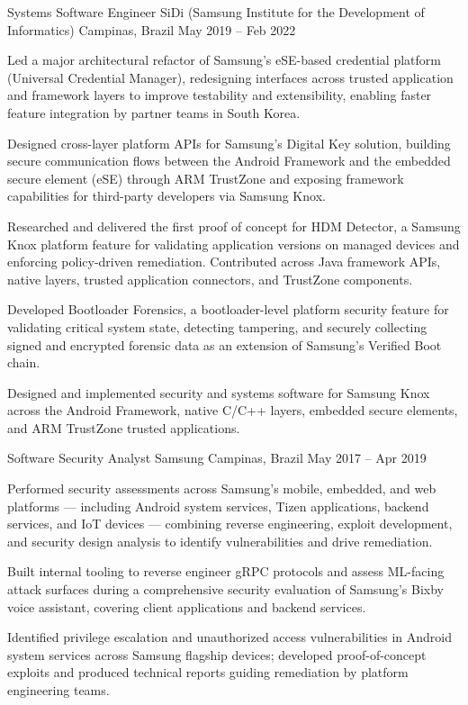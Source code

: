 \begin{cventries}
  \cventry
    {Systems Software Engineer}
    {SiDi (Samsung Institute for the Development of Informatics)}
    {Campinas, Brazil}
    {May 2019 -- Feb 2022}
    {
      \begin{cvitems}
        \item {Led a major architectural refactor of Samsung's eSE-based credential platform (Universal Credential Manager), redesigning interfaces across trusted application and framework layers to improve testability and extensibility, enabling faster feature integration by partner teams in South Korea.}
        \item {Designed cross-layer platform APIs for Samsung's Digital Key solution, building secure communication flows between the Android Framework and the embedded secure element (eSE) through ARM TrustZone and exposing framework capabilities for third-party developers via Samsung Knox.}
        \item {Researched and delivered the first proof of concept for HDM Detector, a Samsung Knox platform feature for validating application versions on managed devices and enforcing policy-driven remediation. Contributed across Java framework APIs, native layers, trusted application connectors, and TrustZone components.}
        \item {Developed Bootloader Forensics, a bootloader-level platform security feature for validating critical system state, detecting tampering, and securely collecting signed and encrypted forensic data as an extension of Samsung's Verified Boot chain.}
        \item {Designed and implemented security and systems software for Samsung Knox across the Android Framework, native C/C++ layers, embedded secure elements, and ARM TrustZone trusted applications.}
      \end{cvitems}
    }
 
 
  \cventry
    {Software Security Analyst}
    {Samsung}
    {Campinas, Brazil}
    {May 2017 -- Apr 2019}
    {
      \begin{cvitems}
        \item {Performed security assessments across Samsung's mobile, embedded, and web platforms — including Android system services, Tizen applications, backend services, and IoT devices — combining reverse engineering, exploit development, and security design analysis to identify vulnerabilities and drive remediation.}
        \item {Built internal tooling to reverse engineer gRPC protocols and assess ML-facing attack surfaces during a comprehensive security evaluation of Samsung's Bixby voice assistant, covering client applications and backend services.}
        \item {Identified privilege escalation and unauthorized access vulnerabilities in Android system services across Samsung flagship devices; developed proof-of-concept exploits and produced technical reports guiding remediation by platform engineering teams.}
      \end{cvitems}
    }
 

\end{cventries}

